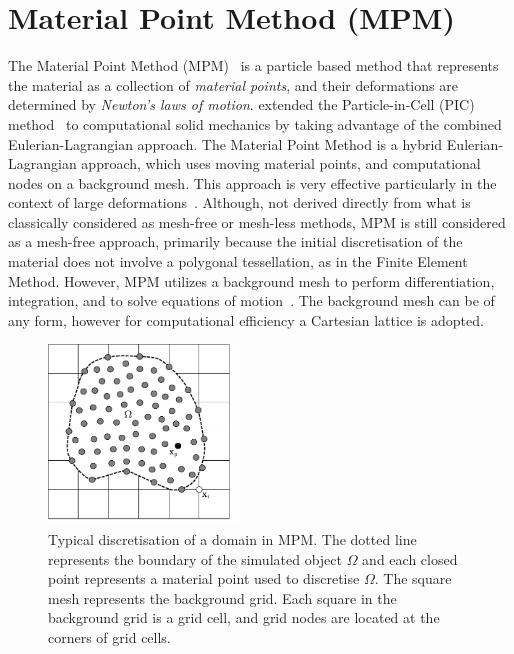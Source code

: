 \section{Material Point Method (MPM)}
The Material Point Method (MPM)~\citep{Sulsky1994,Sulsky1995} is a particle 
based method that represents the material as a collection of \textit{material 
points}, and their deformations are determined by \textit{Newton's laws of 
motion}. \citet{Sulsky1994} extended the Particle-in-Cell (PIC) 
method~\citep{Harlow1964} to computational solid mechanics by taking advantage 
of the combined Eulerian-Lagrangian approach. The Material Point Method is a 
hybrid Eulerian-Lagrangian approach, which uses moving material points, and 
computational nodes on a background mesh. This approach is very effective 
particularly in the context of large 
deformations~\citep{Mackenzie-Helnwein2010,Shin2010a,Mast2014,Andersen2010,Zhang2009,Bandara2013}.
Although, not derived directly from what is classically considered as mesh-free 
or mesh-less methods, MPM is still considered as a mesh-free approach, 
primarily because the initial discretisation of the material does not involve a 
polygonal tessellation, as in the Finite Element Method. However, MPM utilizes 
a background mesh to perform differentiation, integration, and to solve 
equations of motion~\citep{Steffen2008}. The background mesh can be of any 
form, however for computational efficiency a Cartesian lattice is adopted.

\begin{figure}[tbhp]
\centering
\includegraphics[width=0.45\textwidth]{MPM}
\caption[Typical discretisation of a domain in MPM]{Typical discretisation of a 
domain in MPM. The dotted line represents the boundary of the simulated object 
$\Omega$ and each closed point represents a material point used to discretise 
$\Omega$. The square mesh represents the background grid. Each square in the 
background grid is a grid cell, and grid nodes are located at the corners of 
grid cells.}
\label{fig:MPM}
\end{figure}

